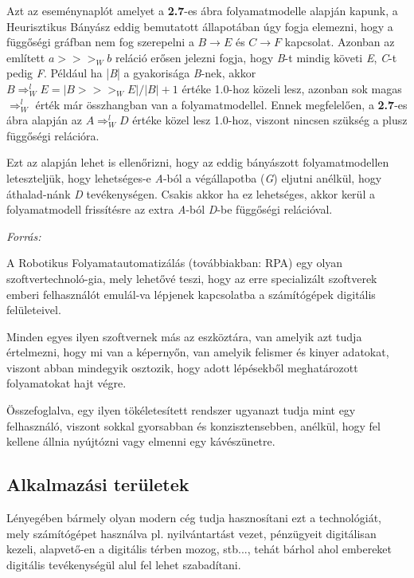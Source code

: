 Azt az eseménynaplót amelyet a \textbf{2.7}-es ábra folyamatmodelle alapján kapunk, a Heurisztikus Bányász eddig bemutatott állapotában úgy fogja elemezni, hogy a függőségi gráfban nem fog szerepelni a $B\rightarrow E$ és $C\rightarrow F$ kapcsolat. Azonban az említett $a>>>_Wb$ reláció erősen jelezni fogja, hogy \textit{B}-t mindig követi \textit{E}, \textit{C}-t pedig \textit{F}. Például ha |\textit{B}| a gyakorisága \textit{B}-nek, akkor $B\Rightarrow_W^l E = |B >>>_WE|/|B|+1$ értéke 1.0-hoz közeli lesz, azonban sok magas $\Rightarrow_W^l $ érték már összhangban van a folyamatmodellel. Ennek megfelelően, a \textbf{2.7}-es ábra alapján az $A\Rightarrow_W^lD$ értéke közel lesz 1.0-hoz, viszont nincsen szükség a plusz függőségi relációra.

Ezt az alapján lehet is ellenőrizni, hogy az eddig bányászott folyamatmodellen leteszteljük, hogy lehetséges-e \textit{A}-ból a végállapotba (\textit{G}) eljutni anélkül, hogy áthalad\hyp{}nánk \textit{D} tevékenységen. Csakis akkor ha ez lehetséges, akkor kerül a folyamatmodell frissítésre az extra \textit{A}-ból \textit{D}-be függőségi relációval.

\textit{Forrás: \cite{book:heuristic}}


A Robotikus Folyamatautomatizálás (továbbiakban: RPA) egy olyan szoftvertechnoló\hyp{}gia, mely lehetővé teszi, hogy az erre specializált szoftverek emberi felhasználót emulál\hyp{}va lépjenek kapcsolatba a számítógépek digitális felületeivel.

Minden egyes ilyen szoftvernek más az eszköztára, van amelyik azt tudja értelmezni, hogy mi van a képernyőn, van amelyik felismer és kinyer adatokat, viszont abban mindegyik osztozik, hogy adott lépésekből meghatározott folyamatokat hajt végre.

Összefoglalva, egy ilyen tökéletesített rendszer ugyanazt tudja mint egy felhasználó, viszont sokkal gyorsabban és konzisztensebben, anélkül, hogy fel kellene állnia nyújtózni vagy elmenni egy kávészünetre.

\subsection{Alkalmazási területek}

Lényegében bármely olyan modern cég tudja hasznosítani ezt a technológiát, mely számítógépet használva pl. nyilvántartást vezet, pénzügyeit digitálisan kezeli, alapvető\hyp{}en a digitális térben mozog, stb..., tehát bárhol ahol embereket digitális tevékenységül alul fel lehet szabadítani.

